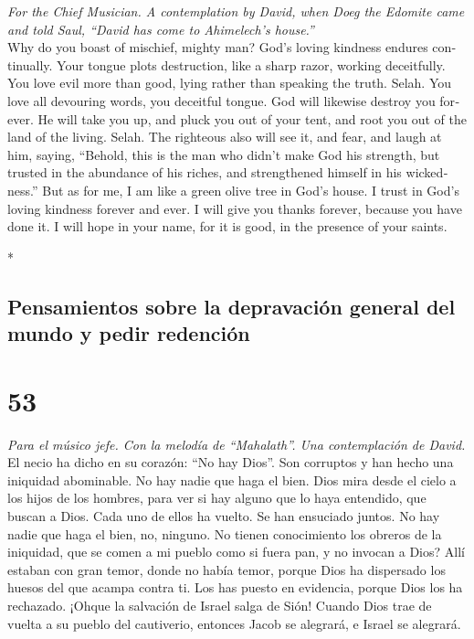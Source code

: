 \begin{paracol}{2}
\begin{otherlanguage}{english}
\emph{For the Chief Musician. A contemplation by David, when Doeg the
Edomite came and told Saul, ``David has come to Ahimelech's house.''}\\
 Why do you boast of mischief, mighty man? God's loving
kindness endures continually.  Your tongue plots
destruction, like a sharp razor, working deceitfully.  You
love evil more than good, lying rather than speaking the truth. Selah.
 You love all devouring words, you deceitful tongue.
 God will likewise destroy you forever. He will take you
up, and pluck you out of your tent, and root you out of the land of the
living. Selah.  The righteous also will see it, and fear,
and laugh at him, saying,  ``Behold, this is the man who
didn't make God his strength, but trusted in the abundance of his
riches, and strengthened himself in his wickedness.''  But
as for me, I am like a green olive tree in God's house. I trust in God's
loving kindness forever and ever.  I will give you thanks
forever, because you have done it. I will hope in your name, for it is
good, in the presence of your saints.

\end{otherlanguage}

\switchcolumn[0]*

\hypertarget{pensamientos-sobre-la-depravaciuxf3n-general-del-mundo-y-pedir-redenciuxf3n-1}{%
\subsection{Pensamientos sobre la depravación general del mundo y pedir
redención}\label{pensamientos-sobre-la-depravaciuxf3n-general-del-mundo-y-pedir-redenciuxf3n-1}}

\hypertarget{section-104}{%
\section{53}\label{section-104}}

\emph{Para el músico jefe. Con la melodía de ``Mahalath''. Una
contemplación de David.}\\
 El necio ha dicho en su corazón: ``No hay Dios''. Son
corruptos y han hecho una iniquidad abominable. No hay nadie que haga el
bien.  Dios mira desde el cielo a los hijos de los
hombres, para ver si hay alguno que lo haya entendido, que buscan a
Dios.  Cada uno de ellos ha vuelto. Se han ensuciado
juntos. No hay nadie que haga el bien, no, ninguno.  No
tienen conocimiento los obreros de la iniquidad, que se comen a mi
pueblo como si fuera pan, y no invocan a Dios?  Allí
estaban con gran temor, donde no había temor, porque Dios ha dispersado
los huesos del que acampa contra ti. Los has puesto en evidencia, porque
Dios los ha rechazado.  ¡Ohque la salvación de Israel
salga de Sión! Cuando Dios trae de vuelta a su pueblo del cautiverio,
entonces Jacob se alegrará, e Israel se alegrará.


\end{paracol}

